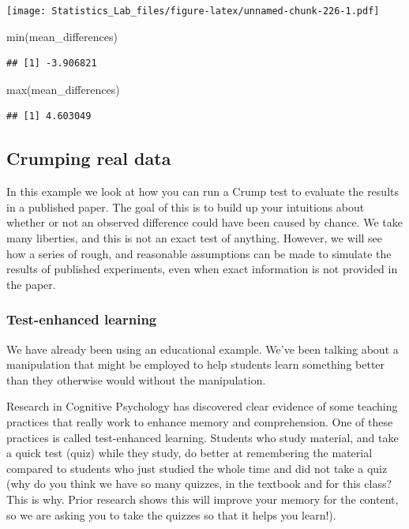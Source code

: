 \documentclass[
]{book}
\newenvironment{Shaded}{\begin{snugshade}}{\end{snugshade}}
\newcommand{\FunctionTok}[1]{\textcolor[rgb]{0.00,0.00,0.00}{#1}}
\newcommand{\NormalTok}[1]{#1}
\begin{document}
\texttt{[image: Statistics\_Lab\_files/figure-latex/unnamed-chunk-226-1.pdf]}

\begin{Shaded}
\begin{Highlighting}[]
\FunctionTok{min}\NormalTok{(mean\_differences)}
\end{Highlighting}
\end{Shaded}

\begin{verbatim}
## [1] -3.906821
\end{verbatim}

\begin{Shaded}
\begin{Highlighting}[]
\FunctionTok{max}\NormalTok{(mean\_differences)}
\end{Highlighting}
\end{Shaded}

\begin{verbatim}
## [1] 4.603049
\end{verbatim}

\hypertarget{crumping-real-data}{%
\subsection{Crumping real data}\label{crumping-real-data}}

In this example we look at how you can run a Crump test to evaluate the results in a published paper. The goal of this is to build up your intuitions about whether or not an observed difference could have been caused by chance. We take many liberties, and this is not an exact test of anything. However, we will see how a series of rough, and reasonable assumptions can be made to simulate the results of published experiments, even when exact information is not provided in the paper.

\hypertarget{test-enhanced-learning}{%
\subsubsection{Test-enhanced learning}\label{test-enhanced-learning}}

We have already been using an educational example. We've been talking about a manipulation that might be employed to help students learn something better than they otherwise would without the manipulation.

Research in Cognitive Psychology has discovered clear evidence of some teaching practices that really work to enhance memory and comprehension. One of these practices is called test-enhanced learning. Students who study material, and take a quick test (quiz) while they study, do better at remembering the material compared to students who just studied the whole time and did not take a quiz (why do you think we have so many quizzes, in the textbook and for this class? This is why. Prior research shows this will improve your memory for the content, so we are asking you to take the quizzes so that it helps you learn!).
\end{document}
